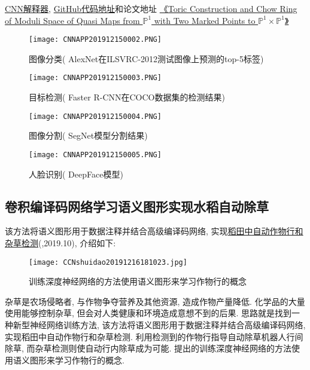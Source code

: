 \href{https://poloclub.github.io/cnn-explainer/}{CNN解释器}, \href{https://github.com/poloclub/cnn-explainer}{GitHub代码地址}和论文地址
\href{https://arxiv.org/abs/2004.1500}{《Toric Construction and Chow Ring of Moduli Space of Quasi Maps from $\mathbb P^1$ with Two Marked Points to $\mathbb P^1\times \mathbb P^1$》}
\begin{figure}[H]
\centering
\texttt{[image: CNNAPP201912150002.PNG]}
\caption{图像分类( AlexNet在ILSVRC-2012测试图像上预测的top-5标签)}
\label{CNNAPP201912150002}\vspace{-0.4cm}
\end{figure}
\begin{figure}[H]
\centering
\texttt{[image: CNNAPP201912150003.PNG]}
\caption{目标检测( Faster R-CNN在COCO数据集的检测结果)}
\label{CNNAPP201912150003}\vspace{-0.4cm}
\end{figure}
\begin{figure}[H]
\centering
\texttt{[image: CNNAPP201912150004.PNG]}
\caption{图像分割( SegNet模型分割结果)}
\label{CNNAPP201912150004}\vspace{-0.4cm}
\end{figure}
\begin{figure}[H]
\centering
\texttt{[image: CNNAPP201912150005.PNG]}
\caption{人脸识别( DeepFace模型)}
\label{CNNAPP201912150005}\vspace{-0.4cm}
\end{figure}
\subsection{卷积编译码网络学习语义图形实现水稻自动除草}
该方法将语义图形用于数据注释并结合高级编译码网络, 实现\href{https://doi.org/10.3389/fpls.2019.01404}{稻田中自动作物行和杂草检测}(\cite{Adhikari-2019},2019.10), 介绍如下:
\begin{figure}[H]
\centering
\texttt{[image: CCNshuidao20191216181023.jpg]}
\caption{训练深度神经网络的方法使用语义图形来学习作物行的概念}
\label{CCNshuidao20191216181023}\vspace{-0.4cm}
\end{figure}
杂草是农场侵略者, 与作物争夺营养及其他资源, 造成作物产量降低. 化学品的大量使用能够控制杂草, 但会对人类健康和环境造成意想不到的后果.
思路就是找到一种新型神经网络训练方法, 该方法将语义图形用于数据注释并结合高级编译码网络, 实现稻田中自动作物行和杂草检测.
利用检测到的作物行指导自动除草机器人行间除草, 而杂草检测则使自动行内除草成为可能. 提出的训练深度神经网络的方法使用语义图形来学习作物行的概念.


